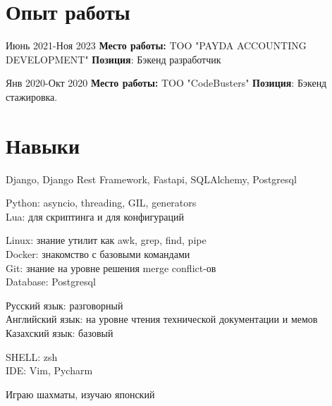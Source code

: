 \documentclass[10pt]{article} %
\begin{document}
\section{Опыт работы}

\job
{Июнь 2021-}{Ноя 2023}
{\textbf{Место работы: }TOO "PAYDA ACCOUNTING DEVELOPMENT"}
{\textbf{Позиция}: Бэкенд разработчик}

\job
{Янв 2020-}{Окт 2020}
{\textbf{Место работы: }TOO "CodeBusters" }
{\textbf{Позиция}: Бэкенд стажировка. }




\section{Навыки}

{
  Django, Django Rest Framework, Fastapi, SQLAlchemy, Postgresql
}

{
  Python: asyncio, threading, GIL, generators\\
  Lua: для скриптинга и для конфигураций
}

{
  Linux: знание утилит как awk, grep, find, pipe\\
  Docker: знакомство с базовыми командами\\
  Git: знание на уровне решения merge conflict-ов\\
  Database: Postgresql
}

{
  Русский язык: разговорный\\
  Английский язык: на уровне чтения технической документации и мемов\\
  Казахский язык: базовый
}


{
  SHELL: zsh\\
  IDE: Vim, Pycharm
}

{
  Играю шахматы, изучаю японский
}
\end{document}
